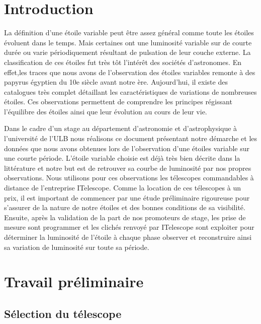 \documentclass[10pt,french, openany]{book}
\begin{document}
\tableofcontents{}
\BgThispage
\mainmatter

\chapter{Introduction}\label{chapt:sum}

La définition d'une étoile variable peut être assez général comme toute les étoiles évoluent dans le temps. Mais certaines ont une luminosité variable sur de courte durée ou varie périodiquement résultant de pulsation de leur couche externe. La classification de ces étoiles fut très tôt l'intérêt des sociétés d'astronomes. En effet,les traces que nous avons de l'observation des étoiles variables remonte à des papyrus égyptien du 10e siècle avant notre ère. Aujourd'hui, il existe des catalogues très complet détaillant les caractéristiques de variations de nombreuses étoiles. Ces observations permettent de comprendre les principes régissant l'équilibre des étoiles ainsi que leur évolution au cours de leur vie.

Dans le cadre d'un stage au département d'astronomie et d'astrophysique à l'université de l'ULB nous réalisons ce document présentant notre démarche et les données que nous avons obtenues lors de l'observation d'une étoiles variable sur une courte période. L'étoile variable choisie est déjà très bien décrite dans la littérature et notre but est de retrouver sa courbe de luminosité par nos propres observations. Nous utilisons pour ces observations les télescopes commandables à distance de l'entreprise ITelescope. Comme la location de ces télescopes à un prix, il est important de commencer par une étude préliminaire rigoureuse pour s'assurer de la nature de notre étoiles et des bonnes conditions de sa visibilité. Ensuite, après la validation de la part de nos promoteurs de stage, les prise de mesure sont programmer et les clichés renvoyé par ITelescope sont exploiter pour déterminer la luminosité de l'étoile à chaque phase observer et reconstruire ainsi sa variation de luminosité sur toute sa période.

\chapter{Travail préliminaire}
\section{Sélection du télescope}
\end{document}
